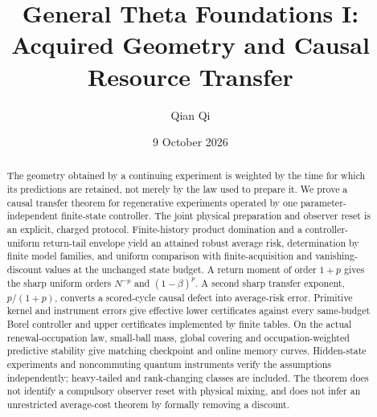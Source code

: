 \documentclass[11pt]{amsart}
\title{General Theta Foundations I: Acquired Geometry and Causal Resource Transfer}
\author{Qian Qi}\date{9 October 2026}
\theoremstyle{definition}\newtheorem{definition}[theorem]{Definition}
\theoremstyle{remark}\newtheorem{remark}[theorem]{Remark}
\begin{document}
\begin{abstract}
The geometry obtained by a continuing experiment is weighted by the time for which its predictions are retained, not merely by the law used to prepare it. We prove a causal transfer theorem for regenerative experiments operated by one parameter-independent finite-state controller. The joint physical preparation and observer reset is an explicit, charged protocol. Finite-history product domination and a controller-uniform return-tail envelope yield an attained robust average risk, determination by finite model families, and uniform comparison with finite-acquisition and vanishing-discount values at the unchanged state budget. A return moment of order $1+p$ gives the sharp uniform orders $N^{-p}$ and $(1-\beta)^p$. A second sharp transfer exponent, $p/(1+p)$, converts a scored-cycle causal defect into average-risk error. Primitive kernel and instrument errors give effective lower certificates against every same-budget Borel controller and upper certificates implemented by finite tables. On the actual renewal-occupation law, small-ball mass, global covering and occupation-weighted predictive stability give matching checkpoint and online memory curves. Hidden-state experiments and noncommuting quantum instruments verify the assumptions independently; heavy-tailed and rank-changing classes are included. The theorem does not identify a compulsory observer reset with physical mixing, and does not infer an unrestricted average-cost theorem by formally removing a discount.
\end{abstract}
\maketitle









\end{document}
